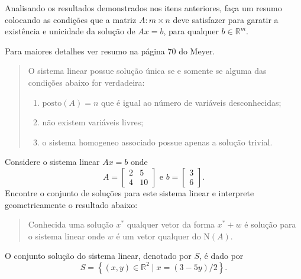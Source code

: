 \documentclass[a4paper,12pt, leqno, answers]{exam}
\newcommand{\EN}{\text{N}}
\begin{document}
\begin{questions}
    \question Analisando os resultados demonstrados nos itens anteriores, fa\c{c}a um resumo colocando as condi\c{c}\~{o}es que a matriz $A: m \times n$ deve satisfazer para garatir a exist\^{e}ncia e unicidade da solu\c{c}\~{a}o de $A x = b$, para qualquer $b \in \mathbb{R}^m$.
    \begin{solution}
        Para maiores detalhes ver resumo na p\'{a}gina 70 do Meyer\nocite{Meyer:2000:matrix}.
        \begin{quote}
            O sistema linear possue solu\c{c}\~{a}o única se e somente se alguma das condi\c{c}\~{o}es abaixo for verdadeira:
            \begin{enumerate}
                \item $\text{posto}(A) = n$ que \'{e} igual ao número de vari\'{a}veis desconhecidas;
                \item n\~{a}o existem vari\'{a}veis livres;
                \item o sistema homogeneo associado possue apenas a solu\c{c}\~{a}o trivial.
            \end{enumerate}
        \end{quote}
    \end{solution}

    \question Considere o sistema linear $A x = b$ onde
    \[
    A = \begin{bmatrix}
        2 & 5 \\
        4 & 10
    \end{bmatrix} \text{ e } b = \begin{bmatrix}
        3 \\
        6
    \end{bmatrix}.
    \]
    Encontre o conjunto de solu\c{c}\~{o}es para este sistema linear e interprete geometricamente o resultado abaixo:
    \begin{quote}
        Conhecida uma solu\c{c}\~{a}o $x^*$ qualquer vetor da forma $x^* + w$ \'{e} solu\c{c}\~{a}o para o sistema linear onde $w$ \'{e} um vetor qualquer do $\EN (A)$.
    \end{quote}
    \begin{solution}
        O conjunto solu\c{c}\~{a}o do sistema linear, denotado por $S$, \'{e} dado por
        \[
        S = \left\{ (x, y) \in \mathbb{R}^2 \mid x = \left( 3 - 5 y \right) / 2 \right\}.
        \]

        \begin{center}
        \end{center}
    \end{solution}


\end{questions}
\end{document}
